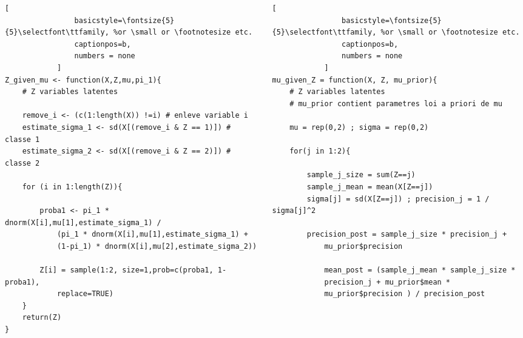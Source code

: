 \documentclass{presentation_template}
\begin{document}
\begin{frame}[fragile]
    \vspace{-0.2cm}
    \begin{columns}
        \begin{column}{0.5\textwidth}
            
            \begin{lstlisting}[
                basicstyle=\fontsize{5}{5}\selectfont\ttfamily, %or \small or \footnotesize etc.
                captionpos=b,
                numbers = none
            ]
Z_given_mu <- function(X,Z,mu,pi_1){
    # Z variables latentes
    
    remove_i <- (c(1:length(X)) !=i) # enleve variable i
    estimate_sigma_1 <- sd(X[(remove_i & Z == 1)]) # classe 1
    estimate_sigma_2 <- sd(X[(remove_i & Z == 2)]) # classe 2 
                    
    for (i in 1:length(Z)){
                    
        proba1 <- pi_1 * dnorm(X[i],mu[1],estimate_sigma_1) / 
            (pi_1 * dnorm(X[i],mu[1],estimate_sigma_1) + 
            (1-pi_1) * dnorm(X[i],mu[2],estimate_sigma_2))

        Z[i] = sample(1:2, size=1,prob=c(proba1, 1-proba1),
            replace=TRUE)
    }
    return(Z)
}
        \end{lstlisting}
            
        \end{column}
        \begin{column}{0.5\textwidth}  %
            
            \begin{lstlisting}[
                basicstyle=\fontsize{5}{5}\selectfont\ttfamily, %or \small or \footnotesize etc.
                captionpos=b,
                numbers = none
            ]
mu_given_Z = function(X, Z, mu_prior){
    # Z variables latentes  
    # mu_prior contient parametres loi a priori de mu

    mu = rep(0,2) ; sigma = rep(0,2)
        
    for(j in 1:2){
        
        sample_j_size = sum(Z==j) 
        sample_j_mean = mean(X[Z==j])
        sigma[j] = sd(X[Z==j]) ; precision_j = 1 / sigma[j]^2
        
        precision_post = sample_j_size * precision_j + 
            mu_prior$precision
        
            mean_post = (sample_j_mean * sample_j_size * 
            precision_j + mu_prior$mean * 
            mu_prior$precision ) / precision_post
        

\end{lstlisting}
\end{column}
\end{columns}
\end{frame}
\end{document}
